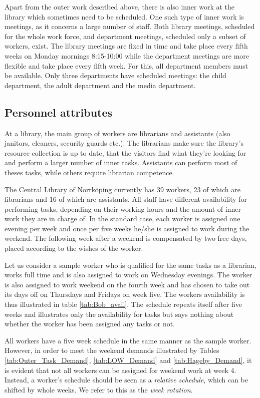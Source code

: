 Apart from the outer work described above, there is also inner work at the library which sometimes need to be scheduled. One such type of inner work is meetings, as it concerns a large number of staff. Both library meetings, scheduled for the whole work force, and department meetings, scheduled only a subset of workers, exist. The library meetings are fixed in time and take place every fifth weeks on Monday mornings 8:15-10:00 while the department meetings are more flexible and take place every fifth week. For this, all department members must be available. Only three departments have scheduled meetings: the child department, the adult department and the media department.

\subsection{Personnel attributes}

At a library, the main group of workers are librarians and assistants (also janitors, cleaners, security guards etc.). The librarians make sure the library's resource collection is up to date, that the visitors find what they're looking for and perform a larger number of inner tasks. Assistants can perform most of theses tasks, while others require librarian competence.

The Central Library of Norrköping currently has 39 workers, 23 of which are librarians and 16 of which are assistants. All staff have different availability for performing tasks, depending on their working hours and the amount of inner work they are in charge of. In the standard case, each worker is assigned one evening per week and once per five weeks he/she is assigned to work during the weekend. The following week after a weekend is compensated by two free days, placed according to the wishes of the worker.

Let us consider a sample worker who is qualified for the same tasks as a librarian, works full time and is also assigned to work on Wednesday evenings. The worker is also assigned to work weekend on the fourth week and has chosen to take out its days off on Thursdays and Fridays on week five. The workers availability is thus illustrated in table \ref{tab:Bob_avail}. The schedule repeats itself after five weeks and illustrates only the availability for tasks but says nothing about whether the worker has been assigned any tasks or not.

All workers have a five week schedule in the same manner as the sample worker. However, in order to meet the weekend demands illustrated by Tables \ref{tab:Outer_Task_Demand}, \ref{tab:LOW_Demand} and \ref{tab:Hageby_Demand}, it is evident that not all workers can be assigned for weekend work at week 4. Instead, a worker's schedule should be seen as a \textit{relative schedule}, which can be shifted by whole weeks. We refer to this as the \textit{week rotation}.

